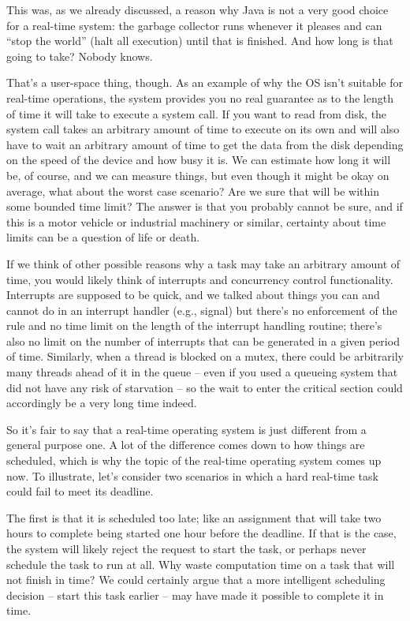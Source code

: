 This was, as we already discussed, a reason why Java is not a very good choice for a real-time system: the garbage collector runs whenever it pleases and can ``stop the world'' (halt all execution) until that is finished. And how long is that going to take? Nobody knows.

That's a user-space thing, though. As an example of why the OS isn't suitable for real-time operations, the system provides you no real guarantee as to the length of time it will take to execute a system call. If you want to read from disk, the system call takes an arbitrary amount of time to execute on its own and will also have to wait an arbitrary amount of time to get the data from the disk depending on the speed of the device and how busy it is. We can estimate how long it will be, of course, and we can measure things, but even though it might be okay on average, what about the worst case scenario? Are we sure that will be within some bounded time limit? The answer is that you probably cannot be sure, and if this is a motor vehicle or industrial machinery or similar, certainty about time limits can be a question of life or death.

If we think of other possible reasons why a task may take an arbitrary amount of time, you would likely think of interrupts and concurrency control functionality. Interrupts are supposed to be quick, and we talked about things you can and cannot do in an interrupt handler (e.g., signal) but there's no enforcement of the rule and no time limit on the length of the interrupt handling routine; there's also no limit on the number of interrupts that can be generated in a given period of time. Similarly, when a thread is blocked on a mutex, there could be arbitrarily many threads ahead of it in the queue -- even if you used a queueing system that did not have any risk of starvation -- so the wait to enter the critical section could accordingly be a very long time indeed.

So it's fair to say that a real-time operating system is just different from a general purpose one. A lot of the difference comes down to how things are scheduled, which is why the topic of the real-time operating system comes up now. To illustrate, let's consider two scenarios in which a hard real-time task could fail to meet its deadline. 

The first is that it is scheduled too late; like an assignment that will take two hours to complete being started one hour before the deadline. If that is the case, the system will likely reject the request to start the task, or perhaps never schedule the task to run at all. Why waste computation time on a task that will not finish in time? We could certainly argue that a more intelligent scheduling decision -- start this task earlier -- may have made it possible to complete it in time.


